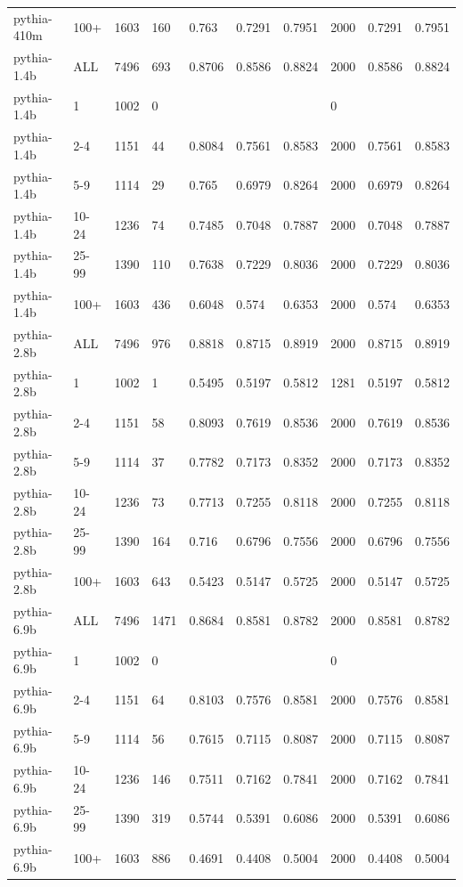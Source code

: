 \begin{tabular}{llllllllll}
pythia-410m & 100+ & 1603 & 160 & 0.763 & 0.7291 & 0.7951 & 2000 & 0.7291 & 0.7951 \\
pythia-1.4b & ALL & 7496 & 693 & 0.8706 & 0.8586 & 0.8824 & 2000 & 0.8586 & 0.8824 \\
pythia-1.4b & 1 & 1002 & 0 &  &  &  & 0 &  &  \\
pythia-1.4b & 2-4 & 1151 & 44 & 0.8084 & 0.7561 & 0.8583 & 2000 & 0.7561 & 0.8583 \\
pythia-1.4b & 5-9 & 1114 & 29 & 0.765 & 0.6979 & 0.8264 & 2000 & 0.6979 & 0.8264 \\
pythia-1.4b & 10-24 & 1236 & 74 & 0.7485 & 0.7048 & 0.7887 & 2000 & 0.7048 & 0.7887 \\
pythia-1.4b & 25-99 & 1390 & 110 & 0.7638 & 0.7229 & 0.8036 & 2000 & 0.7229 & 0.8036 \\
pythia-1.4b & 100+ & 1603 & 436 & 0.6048 & 0.574 & 0.6353 & 2000 & 0.574 & 0.6353 \\
pythia-2.8b & ALL & 7496 & 976 & 0.8818 & 0.8715 & 0.8919 & 2000 & 0.8715 & 0.8919 \\
pythia-2.8b & 1 & 1002 & 1 & 0.5495 & 0.5197 & 0.5812 & 1281 & 0.5197 & 0.5812 \\
pythia-2.8b & 2-4 & 1151 & 58 & 0.8093 & 0.7619 & 0.8536 & 2000 & 0.7619 & 0.8536 \\
pythia-2.8b & 5-9 & 1114 & 37 & 0.7782 & 0.7173 & 0.8352 & 2000 & 0.7173 & 0.8352 \\
pythia-2.8b & 10-24 & 1236 & 73 & 0.7713 & 0.7255 & 0.8118 & 2000 & 0.7255 & 0.8118 \\
pythia-2.8b & 25-99 & 1390 & 164 & 0.716 & 0.6796 & 0.7556 & 2000 & 0.6796 & 0.7556 \\
pythia-2.8b & 100+ & 1603 & 643 & 0.5423 & 0.5147 & 0.5725 & 2000 & 0.5147 & 0.5725 \\
pythia-6.9b & ALL & 7496 & 1471 & 0.8684 & 0.8581 & 0.8782 & 2000 & 0.8581 & 0.8782 \\
pythia-6.9b & 1 & 1002 & 0 &  &  &  & 0 &  &  \\
pythia-6.9b & 2-4 & 1151 & 64 & 0.8103 & 0.7576 & 0.8581 & 2000 & 0.7576 & 0.8581 \\
pythia-6.9b & 5-9 & 1114 & 56 & 0.7615 & 0.7115 & 0.8087 & 2000 & 0.7115 & 0.8087 \\
pythia-6.9b & 10-24 & 1236 & 146 & 0.7511 & 0.7162 & 0.7841 & 2000 & 0.7162 & 0.7841 \\
pythia-6.9b & 25-99 & 1390 & 319 & 0.5744 & 0.5391 & 0.6086 & 2000 & 0.5391 & 0.6086 \\
pythia-6.9b & 100+ & 1603 & 886 & 0.4691 & 0.4408 & 0.5004 & 2000 & 0.4408 & 0.5004 \\
\bottomrule
\end{tabular}
